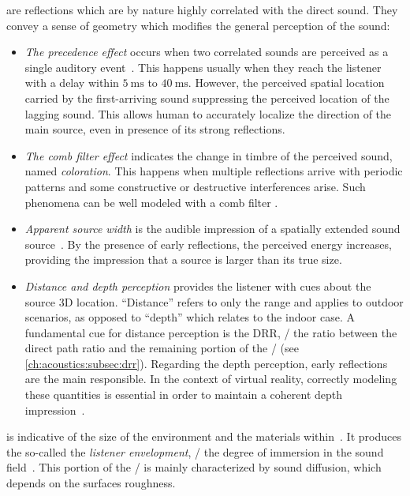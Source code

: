  are reflections which are by nature highly correlated with the direct sound.
They convey a sense of geometry which modifies the general perception of the sound:
\begin{itemize}
    \item \textit{The precedence effect} occurs when two correlated sounds are perceived as a single auditory event~.
    This happens usually when they reach the listener with a delay within $\SI{5}{\ms}$ to $\SI{40}{\ms}$.
    However, the perceived spatial location carried by the first-arriving sound suppressing the perceived location of the lagging sound.
    This allows human to accurately localize the direction of the main source, even in presence of its strong reflections.
    \item \textit{The comb filter effect} indicates the change in timbre of the perceived sound, named \textit{coloration}.
    This happens when multiple reflections arrive with periodic patterns and some constructive or destructive interferences arise.
    Such phenomena can be well modeled with a comb filter .
    \item \textit{Apparent source width} is the audible impression of a spatially extended sound source~.
    By the presence of early reflections, the perceived energy increases, providing the impression that a source is larger than its true size.
    \item \textit{Distance and depth perception} provides the listener with cues about the source 3D location.
    ``Distance'' refers to only the range and applies to outdoor scenarios, as opposed to ``depth'' which relates to the indoor case.
    A fundamental cue for distance perception is the \ac{DRR}, \ie/ the ratio between the direct path ratio and the remaining portion of the \RIR/ (see \cref{ch:acoustics:subsec:drr}).
    Regarding the depth perception, early reflections are the main responsible.
    In the context of virtual reality, correctly modeling these quantities is essential in order to maintain a coherent depth impression~.
\end{itemize}

 is indicative of the size of the environment and the materials within~.
It produces the so-called the \textit{listener envelopment}, \ie/ the degree of immersion in the sound field~.
This portion of the \RIR/ is mainly characterized by sound diffusion, which depends on the surfaces roughness.

